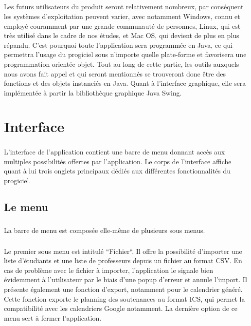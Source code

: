 \documentclass[a4paper,10pt]{report}
\begin{document}
	\paragraph{}
	  Les futurs utilisateurs du produit seront relativement nombreux, par conséquent les systèmes d'exploitation peuvent varier, avec notamment Windows, connu et employé couramment par une grande communauté de personnes, Linux, qui est très utilisé dans le cadre de nos études, et Mac OS, qui devient de plus en plus répandu.
	  C'est pourquoi toute l'application sera programmée en Java, ce qui permettra l'usage du progiciel sous n'importe quelle plate-forme et favorisera une programmation orientée objet.
	  Tout au long de cette partie, les outils auxquels nous avons fait appel et qui seront mentionnés se trouveront donc être des fonctions et des objets instanciés en Java.
	  Quant à l'interface graphique, elle sera implémentée à partir la bibliothèque graphique Java Swing.
  
  
  \chapter{Interface}	%
	\paragraph{}
	  L'interface de l'application contient une barre de menu donnant accès aux multiples possibilités offertes par l'application.
	  Le corps de l'interface affiche quant à lui trois onglets principaux dédiés aux différentes fonctionnalités du progiciel. 
	  
	\section{Le menu}
	  \paragraph{}
	    La barre de menu est composée elle-même de plusieurs sous menus.
	  \paragraph{}
	    Le premier sous menu est intitulé ``Fichier``. Il offre la possibilité d'importer une liste d'étudiants et une liste de professeurs depuis un fichier au format CSV.
	    En cas de problème avec le fichier à importer, l'application le signale bien évidemment à l'utilisateur par le biais d'une popup d'erreur et annule l'import.
	    Il présente également une fonction d'export, notamment pour le calendrier généré. Cette fonction exporte le planning des soutenances au format ICS, qui permet la compatibilité avec les calendriers Google notamment.
	    La dernière option de ce menu sert à fermer l'application.
\end{document}
